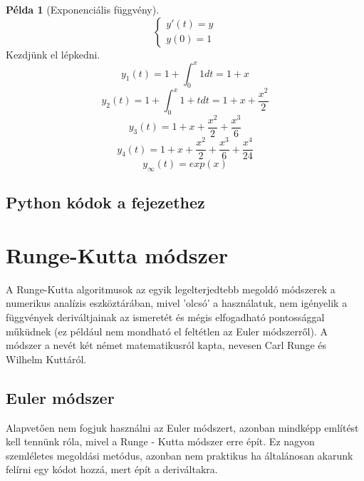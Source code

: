 \documentclass{article}
\theoremstyle{definition}
\theoremstyle{theorem}
\newtheorem{example}{Példa}
\begin{document}
\begin{example}[Exponenciális függvény]
\begin{equation*}
    \begin{cases}
       y'(t) = y\\
       y(0) = 1
    \end{cases}
\end{equation*}
Kezdjünk el lépkedni.
\begin{equation*}
    y_1(t) = 1 + \int_0^x 1 dt = 1 + x
\end{equation*}
\begin{equation*}
    y_2(t) = 1 + \int_0^x 1+t dt = 1 + x + \frac{x^2}{2}
\end{equation*}
\begin{equation*}
    y_3(t) =  1 + x + \frac{x^2}{2} + \frac{x^3}{6}
\end{equation*}
\begin{equation*}
    y_4(t) = 1 + x + \frac{x^2}{2} + \frac{x^3}{6} + \frac{x^4}{24}
\end{equation*}
\begin{equation*}
    y_{\infty}(t) = exp(x)
\end{equation*}
\end{example}
\subsection{Python kódok a fejezethez}

\section{Runge-Kutta módszer}
A Runge-Kutta algoritmusok az egyik legelterjedtebb megoldó módszerek a numerikus analízis eszköztárában, mivel 'olcsó' a használatuk, nem igényelik a függvények deriváltjainak az ismeretét és mégis elfogadható pontossággal műküdnek (ez például nem mondható el feltétlen az Euler módszerről). A módszer a nevét két német matematikusról kapta, nevesen Carl Runge és Wilhelm Kuttáról.

\subsection{Euler módszer}
Alapvetően nem fogjuk használni az Euler módszert, azonban mindképp említést kell tennünk róla, mivel a Runge - Kutta módszer erre épít. Ez nagyon szemléletes megoldási metódus, azonban nem praktikus ha általánosan akarunk felírni egy kódot hozzá, mert épít a deriváltakra.\\
\end{document}
